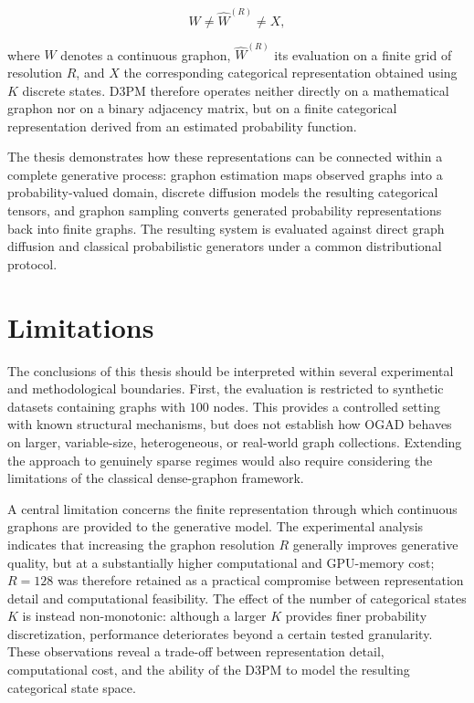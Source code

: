 \[
W
\neq
\widehat{W}^{(R)}
\neq
X,
\]

where \(W\) denotes a continuous graphon, \(\widehat{W}^{(R)}\) its evaluation on a finite grid of resolution \(R\), and \(X\) the corresponding categorical representation obtained using \(K\) discrete states. D3PM therefore operates neither directly on a mathematical graphon nor on a binary adjacency matrix, but on a finite categorical representation derived from an estimated probability function.

The thesis demonstrates how these representations can be connected within a complete generative process: graphon estimation maps observed graphs into a probability-valued domain, discrete diffusion models the resulting categorical tensors, and graphon sampling converts generated probability representations back into finite graphs. The resulting system is evaluated against direct graph diffusion and classical probabilistic generators under a common distributional protocol.

\section{Limitations}
\label{sec:conclusions_limitations}

The conclusions of this thesis should be interpreted within several experimental and methodological boundaries. First, the evaluation is restricted to synthetic datasets containing graphs with \(100\) nodes. This provides a controlled setting with known structural mechanisms, but does not establish how OGAD behaves on larger, variable-size, heterogeneous, or real-world graph collections. Extending the approach to genuinely sparse regimes would also require considering the limitations of the classical dense-graphon framework.

A central limitation concerns the finite representation through which continuous graphons are provided to the generative model. The experimental analysis indicates that increasing the graphon resolution \(R\) generally improves generative quality, but at a substantially higher computational and GPU-memory cost; \(R=128\) was therefore retained as a practical compromise between representation detail and computational feasibility. The effect of the number of categorical states \(K\) is instead non-monotonic: although a larger \(K\) provides finer probability discretization, performance deteriorates beyond a certain tested granularity. These observations reveal a trade-off between representation detail, computational cost, and the ability of the D3PM to model the resulting categorical state space.


